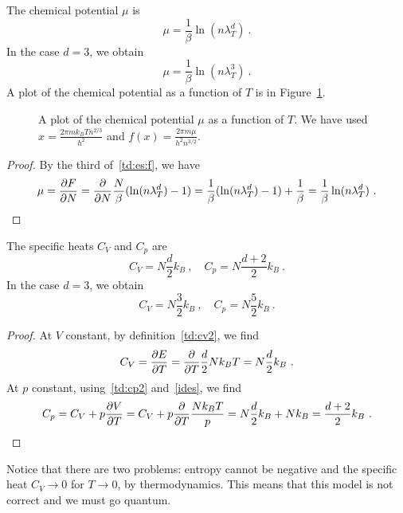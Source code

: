     The chemical potential $\mu$ is 
    \begin{equation*}
        \mu = \frac{1}{\beta} \ln (n \lambda_T^d) ~.
    \end{equation*}
    In the case $d=3$, we obtain 
    \begin{equation*}
        \mu = \frac{1}{\beta} \ln (n \lambda_T^3) ~.
    \end{equation*}
    A plot of the chemical potential as a function of $T$ is in Figure~\ref{fig:c:chem}.
    \begin{figure}
        \centering
        \caption{A plot of the chemical potential $\mu$ as a function of $T$. We have used $x = \frac{2 \pi m k_B T n^{2/3}}{h^2}$ and $f(x) = \frac{2 \pi m \mu}{h^2 n^{3/2}}$.}
        \label{fig:c:chem}
    \end{figure}
    \begin{proof}
        By the third of~\eqref{td:es:f}, we have
        \begin{equation*}
            \mu = \frac{\partial F}{\partial N} = \frac{\partial}{\partial N} \frac{N}{\beta} (\ln (n \lambda_T^d) - 1) = \frac{1}{\beta} (\ln (n \lambda_T^d) - 1) + \frac{1}{\beta} = \frac{1}{\beta} \ln (n \lambda_T^d) ~.
        \end{equation*}
    \end{proof}
    The specific heats $C_V$ and $C_p$ are 
    \begin{equation*}
        C_V = N \frac{d}{2} k_B ~, \quad C_p = N \frac{d+2}{2} k_B ~. 
    \end{equation*}
    In the case $d=3$, we obtain 
    \begin{equation*}
        C_V = N \frac{3}{2} k_B ~, \quad C_p = N \frac{5}{2} k_B ~. 
    \end{equation*}
    \begin{proof}
        At $V$ constant, by definition~\eqref{td:cv2}, we find
        \begin{equation*}
            C_V = \frac{\partial E}{\partial T} = \frac{\partial}{\partial T} \frac{d}{2} N k_B T = N \frac{d}{2} k_B ~.
        \end{equation*}
        At $p$ constant, using~\eqref{td:cp2} and~\eqref{ides}, we find
        \begin{equation*}
            C_p = C_V + p \frac{\partial V}{\partial T} = C_V + p \frac{\partial}{\partial T} \frac{N k_B T}{p} = N \frac{d}{2} k_B + N k_B = \frac{d + 2}{2} k_B ~.
        \end{equation*}
    \end{proof}
    Notice that there are two problems: entropy cannot be negative and the specific heat $C_V \rightarrow 0$ for $T \rightarrow 0$, by thermodynamics. This means that this model is not correct and we must go quantum.

